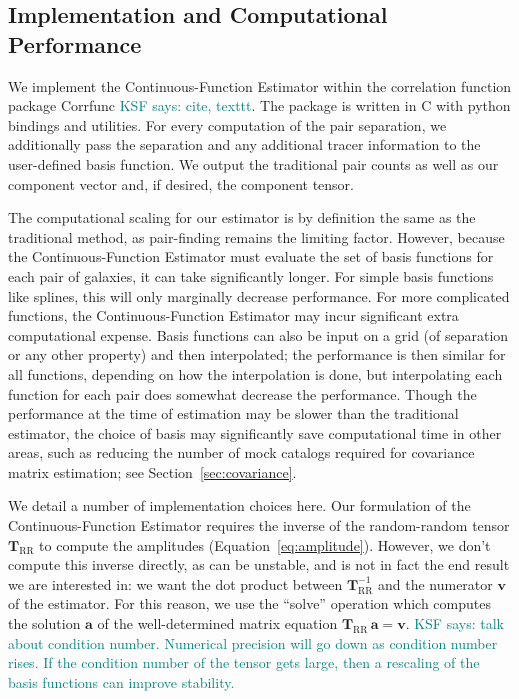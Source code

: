 \documentclass[modern]{aastex62}
\newcommand{\est}{the Continuous-Function Estimator\xspace}
\newcommand{\inv}{^{-1}}
\newcommand{\bld}[1]{\bm{#1}} %
\newcommand{\vv}[1]{\bld{v}_\mathrm{#1}}
\newcommand{\TT}[1]{\bld{T}_\mathrm{#1}}
\newcommand{\KSF}[1]{\textcolor{teal}{KSF says: #1}}
\begin{document}
\subsection{Implementation and Computational Performance}
\label{sec:comp}

We implement \est within the correlation function package Corrfunc \KSF{cite, texttt}.
The package is written in C with python bindings and utilities.
For every computation of the pair separation, we additionally pass the separation and any additional tracer information to the user-defined basis function.
We output the traditional pair counts as well as our component vector and, if desired, the component tensor.

The computational scaling for our estimator is by definition the same as the traditional method, as pair-finding remains the limiting factor.
However, because \est must evaluate the set of basis functions for each pair of galaxies, it can take significantly longer.
For simple basis functions like splines, this will only marginally decrease performance.
For more complicated functions, \est may incur significant extra computational expense.
Basis functions can also be input on a grid (of separation or any other property) and then interpolated; the performance is then similar for all functions, depending on how the interpolation is done, but interpolating each function for each pair does somewhat decrease the performance.
Though the performance at the time of estimation may be slower than the traditional estimator, the choice of basis may significantly save computational time in other areas, such as reducing the number of mock catalogs required for covariance matrix estimation; see Section~\ref{sec:covariance}.

We detail a number of implementation choices here.
Our formulation of \est requires the inverse of the random-random tensor $\TT{RR}$ to compute the amplitudes (Equation~\ref{eq:amplitude}).
However, we don't compute this inverse directly, as can be unstable, and is not in fact the end result we are interested in: we want the dot product between $\TT{RR}\inv$ and the numerator $\vv{}$ of the estimator.
For this reason, we use the ``solve'' operation which computes the solution $\bld{a}$ of the well-determined matrix equation $\TT{RR}\,\bld{a}=\bld{v}$.
\KSF{talk about condition number. Numerical precision will go down as condition number rises. If the condition number of the tensor gets large, then a rescaling of the basis functions can improve stability. }
\end{document}
